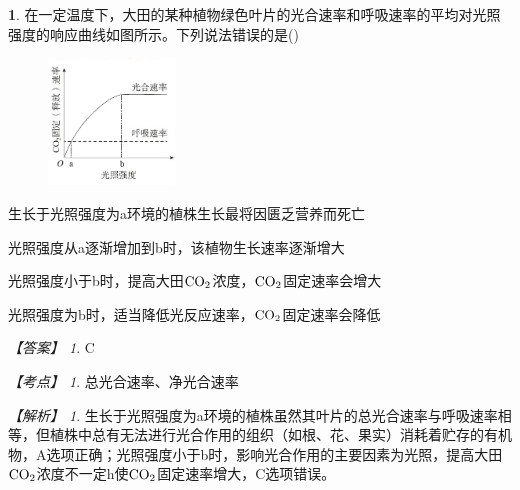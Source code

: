 \documentclass[UTF8, 10pt, a4paper, oneside]{ctexart}
\theoremstyle{definition}
\newtheorem{exercise}{}
\theoremstyle{remark}
\newtheorem*{answer}{【答案】}
\newtheorem*{point}{【考点】}      %
\newtheorem*{explanation}{【解析】}     %
\theoremstyle{plain}
\begin{document}
\begin{exercise}
    在一定温度下，大田的某种植物绿色叶片的光合速率和呼吸速率的平均对光照强度的响应曲线如图所示。下列说法错误的是\quad(\quad)
    \begin{adjustwidth}{2em}{}\vspace{-3em}
        \begin{figure}[h!]
            \flushright
            \includegraphics[width=0.3\textwidth]{assists/2-1.jpg}
        \end{figure}\vspace{-15em}
        \begin{asparaenum}[A. ]
            \item 生长于光照强度为a环境的植株生长最将因匮乏营养而死亡
            \item 光照强度从a逐渐增加到b时，该植物生长速率逐渐增大
            \item 光照强度小于b时，提高大田$\ce{CO2}$浓度，$\ce{CO2}$固定速率会增大
            \item 光照强度为b时，适当降低光反应速率，$\ce{CO2}$固定速率会降低
        \end{asparaenum}\vspace{0.5em}
    \end{adjustwidth}
    \begin{answer}
        C
    \end{answer}\vspace{0.25em}
    \begin{point}
        总光合速率、净光合速率\vspace{0.5em}
    \end{point}
    \begin{explanation}
        生长于光照强度为a环境的植株虽然其叶片的总光合速率与呼吸速率相等，但植株中总有无法进行光合作用的组织（如根、花、果实）消耗着贮存的有机物，A选项正确；光照强度小于b时，影响光合作用的主要因素为光照，提高大田$\ce{CO2}$浓度不一定h使$\ce{CO2}$固定速率增大，C选项错误。
    \end{explanation}
\end{exercise}
\end{document}
